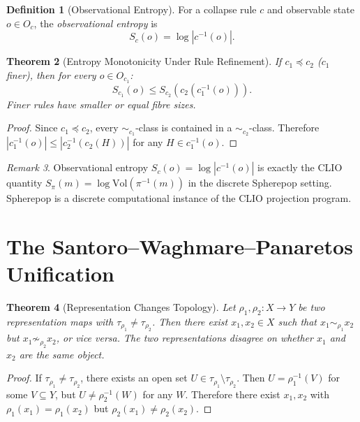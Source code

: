 \documentclass[12pt, a4paper, openany]{book}
\theoremstyle{plain}
\newtheorem{theorem}{Theorem}[chapter]
\theoremstyle{definition}
\newtheorem{definition}[theorem]{Definition}
\theoremstyle{remark}
\newtheorem{remark}[theorem]{Remark}
\begin{document}
\begin{definition}[Observational Entropy]
For a collapse rule $c$ and observable state $o \in O_c$, the
\emph{observational entropy} is
\[
S_c(o) = \log |c^{-1}(o)|.
\]
\end{definition}

\begin{theorem}[Entropy Monotonicity Under Rule Refinement]
If $c_1 \preceq c_2$ ($c_1$ finer), then for every $o \in O_{c_1}$:
\[
S_{c_1}(o) \leq S_{c_2}(c_2(c_1^{-1}(o))).
\]
Finer rules have smaller or equal fibre sizes.
\end{theorem}

\begin{proof}
Since $c_1 \preceq c_2$, every $\sim_{c_1}$-class is contained in a
$\sim_{c_2}$-class. Therefore $|c_1^{-1}(o)| \leq |c_2^{-1}(c_2(H))|$ for
any $H \in c_1^{-1}(o)$.
\end{proof}

\begin{remark}
Observational entropy $S_c(o) = \log |c^{-1}(o)|$ is exactly the CLIO quantity
$S_\pi(m) = \log \mathrm{Vol}(\pi^{-1}(m))$ in the discrete Spherepop setting.
Spherepop is a discrete computational instance of the CLIO projection program.
\end{remark}

\section{The Santoro--Waghmare--Panaretos Unification}

\begin{theorem}[Representation Changes Topology]
Let $\rho_1, \rho_2 : X \to Y$ be two representation maps with $\tau_{\rho_1} \neq \tau_{\rho_2}$. Then there exist $x_1, x_2 \in X$ such that $x_1 \sim_{\rho_1} x_2$
but $x_1 \not\sim_{\rho_2} x_2$, or vice versa. The two representations disagree
on whether $x_1$ and $x_2$ are the same object.
\end{theorem}

\begin{proof}
If $\tau_{\rho_1} \neq \tau_{\rho_2}$, there exists an open set
$U \in \tau_{\rho_1} \setminus \tau_{\rho_2}$. Then $U = \rho_1^{-1}(V)$ for
some $V \subseteq Y$, but $U \neq \rho_2^{-1}(W)$ for any $W$. Therefore there
exist $x_1, x_2$ with $\rho_1(x_1) = \rho_1(x_2)$ but $\rho_2(x_1) \neq \rho_2(x_2)$.
\end{proof}
\end{document}
